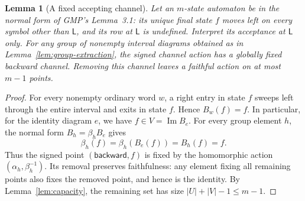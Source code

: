 \documentclass[11pt,a4paper]{article}
\newtheorem{lemma}[theorem]{Lemma}
\theoremstyle{definition}
\theoremstyle{remark}
\newcommand{\LL}{\mathsf L}
\newcommand{\im}{\operatorname{Im}}
\begin{document}
\begin{lemma}[A fixed accepting channel]\label{lem:gmp-fixed-channel}
Let an $m$-state automaton be in the normal form of GMP's
Lemma~3.1: its unique final state $f$ moves left on every symbol
other than $\LL$, and its row at $\LL$ is undefined. Interpret its
acceptance at $\LL$ only. For any group of nonempty interval
diagrams obtained as in Lemma~\ref{lem:group-extraction}, the signed
channel action has a globally fixed backward channel. Removing this
channel leaves a faithful action on at most $m-1$ points.
\end{lemma}
\begin{proof}
For every nonempty ordinary word $w$, a right entry in state $f$
sweeps left through the entire interval and exits in state $f$.
Hence $B_w(f)=f$. In particular, for the identity diagram $e$,
we have $f\in V=\im B_e$. For every group element $h$, the normal
form $B_h=\beta_h B_e$ gives
\[
 \beta_h(f)=\beta_h(B_e(f))=B_h(f)=f.
\]
Thus the signed point $(\mathsf{backward},f)$ is fixed by the
homomorphic action $(\alpha_h,\beta_h^{-1})$.
Its removal preserves faithfulness: any element fixing all remaining
points also fixes the removed point, and hence is the identity.
By Lemma~\ref{lem:capacity}, the remaining set has size
$|U|+|V|-1\le m-1$.
\end{proof}
\end{document}
